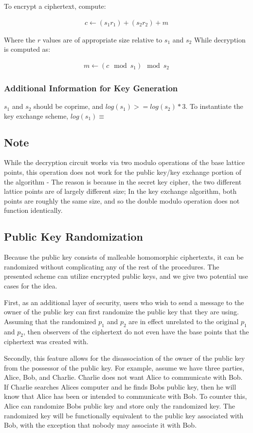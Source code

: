 \documentclass[preprint]{iacrtrans}
\begin{document}
To encrypt a ciphertext, compute:

\begin{align}
   c \gets (s_1 r_1) + (s_2 r_2) + m
\end{align}

Where the $r$ values are of appropriate size relative to $s_1$ and $s_2$ 
While decryption is computed as:

\begin{align}
    m \gets (c \mod s_1) \mod s_2
\end{align}

\subsubsection{Additional Information for Key Generation}
$s_1$ and $s_2$ should be coprime, and $log(s_1) >= log(s_2) * 3$. To instantiate the key exchange scheme, $log(s_1) \equiv $

\subsection{Note}
While the decryption circuit works via two modulo operations of the base lattice points, this operation does not work for the public key/key exchange portion of the algorithm - The reason is because in the secret key cipher, the two different lattice points are of largely different size; In the key exchange algorithm, both points are roughly the same size, and so the double modulo operation does not function identically.

\subsection{Public Key Randomization}
Because the public key consists of malleable homomorphic ciphertexts, it can be randomized without complicating any of the rest of the procedures. The presented scheme can utilize encrypted public keys, and we give two potential use cases for the idea.

First, as an additional layer of security, users who wish to send a message to the owner of the public key can first randomize the public key that they are using. Assuming that the randomized $p_1$ and $p_2$ are in effect unrelated to the original $p_1$ and $p_2$, then observers of the ciphertext do not even have the base points that the ciphertext was created with.

Secondly, this feature allows for the disassociation of the owner of the public key from the possessor of the public key. For example, assume we have three parties, Alice, Bob, and Charlie. Charlie does not want Alice to communicate with Bob. If Charlie searches Alices computer and he finds Bobs public key, then he will know that Alice has been or intended to communicate with Bob. To counter this, Alice can randomize Bobs public key and store only the randomized key. The randomized key will be functionally equivalent to the public key associated with Bob, with the exception that nobody may associate it with Bob. 
\end{document}
